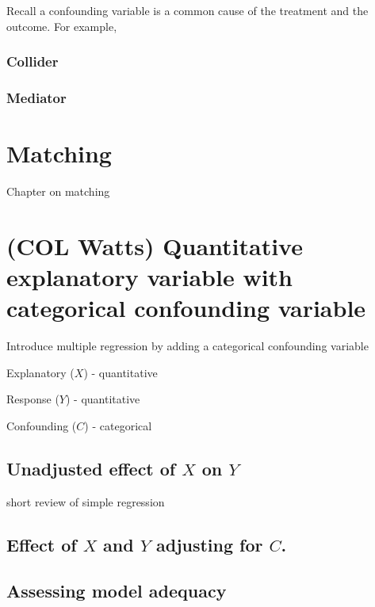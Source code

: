 \documentclass[
]{book}
\begin{document}
Recall a confounding variable is a common cause of the treatment and the outcome. For example,

\hypertarget{collider}{%
\subsection{Collider}\label{collider}}

\hypertarget{mediator}{%
\subsection{Mediator}\label{mediator}}

\hypertarget{matching}{%
\chapter{Matching}\label{matching}}

Chapter on matching

\hypertarget{categorical}{%
\chapter{(COL Watts) Quantitative explanatory variable with categorical confounding variable}\label{categorical}}

Introduce multiple regression by adding a categorical confounding variable

Explanatory (\(X\)) - quantitative

Response (\(Y\)) - quantitative

Confounding (\(C\)) - categorical

\hypertarget{unadjusted-effect-of-x-on-y}{%
\section{\texorpdfstring{Unadjusted effect of \(X\) on \(Y\)}{Unadjusted effect of X on Y}}\label{unadjusted-effect-of-x-on-y}}

short review of simple regression

\hypertarget{effect-of-x-and-y-adjusting-for-c.}{%
\section{\texorpdfstring{Effect of \(X\) and \(Y\) adjusting for \(C\).}{Effect of X and Y adjusting for C.}}\label{effect-of-x-and-y-adjusting-for-c.}}

\hypertarget{assessing-model-adequacy}{%
\section{Assessing model adequacy}\label{assessing-model-adequacy}}
\end{document}
